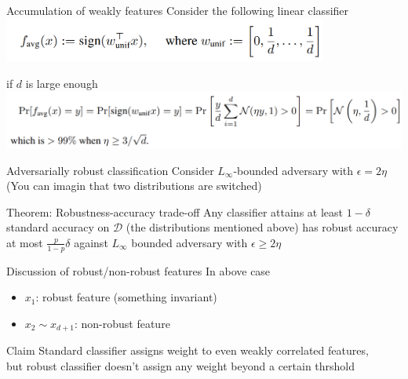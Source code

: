 \documentclass{beamer}
\begin{document}
\begin{frame}{Accumulation of weakly features}
  Consider the following linear classifier
  \includegraphics[width=0.8\textwidth]{fig/p2/lc.png}

  if $d$ is large enough
  \includegraphics[width=\textwidth]{fig/p2/lc-prob.png}

\end{frame}

\begin{frame}{Adversarially robust classification}
  Consider $L_\infty$-bounded adversary with $\epsilon=2\eta$\\
  (You can imagin that two distributions are switched)

  \begin{block}{Theorem: Robustness-accuracy trade-off}
    Any classifier attains at least $1 - \delta$ standard accuracy on $\mathcal{D}$ (the distributions mentioned above) has robust accuracy at most $\frac{p}{1-p}\delta$ against $L_\infty$ bounded adversary with $\epsilon \geq 2\eta$
  \end{block}
\end{frame}

\begin{frame}{Discussion of robust/non-robust features}
  In above case
  \begin{itemize}
    \item $x_1$: robust feature (something invariant)
    \item $x_2 \sim x_{d+1}$: non-robust feature
  \end{itemize}
  \begin{block}{Claim}
    Standard classifier assigns weight to even weakly correlated features, \\but robust classifier doesn't assign any weight beyond a certain thrshold
  \end{block}
\end{frame}
\end{document}
